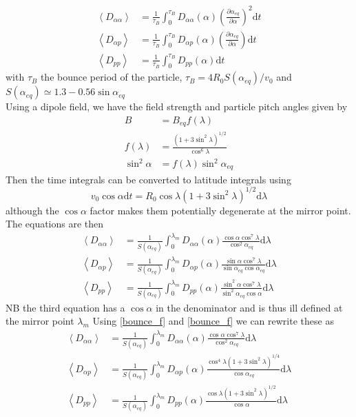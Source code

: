 \documentclass[]{article}
\begin{document}
\begin{align}\label{Bounce_time}
\left< D_{\alpha \alpha}\right> &=\frac{1}{\tau_B} \int_0^{\tau_B} D_{\alpha \alpha}(\alpha) \left(\frac{\partial \alpha_{eq}}{\partial \alpha}\right)^2 \mathrm{d}t\\
\left< D_{\alpha p}\right> &=\frac{1}{\tau_B} \int_0^{\tau_B} D_{\alpha p}(\alpha) \left(\frac{\partial \alpha_{eq}}{\partial \alpha}\right) \mathrm{d}t\\
\left< D_{p p}\right> &=\frac{1}{\tau_B} \int_0^{\tau_B} D_{p p}(\alpha) \mathrm{d}t
\end{align}
with $\tau_B$ the bounce period of the particle, $\tau_B = 4 R_0 S(\alpha_{eq})/v_0$ and $S(\alpha_{eq}) \simeq 1.3 - 0.56 \sin\alpha_{eq}$
\\Using a dipole field, we have the field strength and particle pitch angles given by
\begin{align}
B &= B_{eq} f(\lambda)\\
f(\lambda) &= \frac{(1+3\sin^2\lambda)^{1/2}}{\cos^6\lambda}\label{bounce_f}\\
\sin^2\alpha &= f(\lambda) \sin^2\alpha_{eq}\label{bounce_f2}
\end{align}
Then the time integrals can be converted to latitude integrals using
\begin{equation}
v_0 \cos \alpha \mathrm{d} t = R_0 \cos \lambda (1+3\sin^2\lambda)^{1/2} \mathrm{d}\lambda
\end{equation}
although the $\cos \alpha$ factor makes them potentially degenerate at the mirror point. The equations are then
\begin{align}\label{Bounce_lam}
\left< D_{\alpha \alpha}\right> &=\frac{1}{S(\alpha_{eq})} \int_0^{\lambda_m} D_{\alpha \alpha}(\alpha) \frac{\cos \alpha \cos^7\lambda}{\cos^2\alpha_{eq}} \mathrm{d}\lambda\\
\left< D_{\alpha p}\right> &=\frac{1}{S(\alpha_{eq})} \int_0^{\lambda_m} D_{\alpha p}(\alpha) \frac{\sin \alpha \cos^7\lambda}{\sin \alpha_{eq}\cos\alpha_{eq}} \mathrm{d}\lambda\\
\left< D_{p p}\right> &=\frac{1}{S(\alpha_{eq})} \int_0^{\lambda_m} D_{p p}(\alpha) \frac{\sin^2 \alpha \cos^7\lambda}{\sin^2 \alpha_{eq}\cos\alpha} \mathrm{d}\lambda
\end{align}
NB the third equation has a $\cos\alpha$ in the denominator and is thus ill defined at the mirror point $\lambda_m$
Using \ref{bounce_f} and \ref{bounce_f} we can rewrite these as
\begin{align}\label{Bounce_lam_2}
\left< D_{\alpha \alpha}\right> &=\frac{1}{S(\alpha_{eq})} \int_0^{\lambda_m} D_{\alpha \alpha}(\alpha) \frac{\cos \alpha \cos^7\lambda}{\cos^2\alpha_{eq}} \mathrm{d}\lambda\\
\left< D_{\alpha p}\right> &=\frac{1}{S(\alpha_{eq})} \int_0^{\lambda_m} D_{\alpha p}(\alpha) \frac{\cos^4\lambda (1+3\sin^2\lambda)^{1/4}}{\cos\alpha_{eq}} \mathrm{d}\lambda\\
\left< D_{p p}\right> &=\frac{1}{S(\alpha_{eq})} \int_0^{\lambda_m} D_{p p}(\alpha) \frac{\cos\lambda (1+3\sin^2\lambda)^{1/2}}{\cos\alpha} \mathrm{d}\lambda\label{Bounce_lam_2_c}
\end{align}
\end{document}
